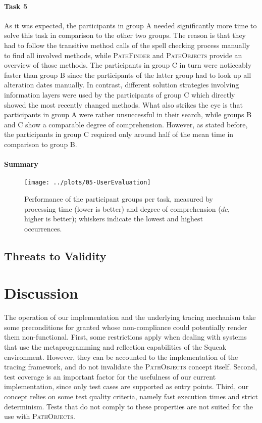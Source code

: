 \paragraph{Task 5} As it was expected, the participants in group A needed significantly more time to solve this task in comparison to the other two groups.
The reason is that they had to follow the transitive method calls of the spell checking process manually to find all involved methods, while \textsc{PathFinder} and \textsc{PathObjects} provide an overview of those methods.
The participants in group C in turn were noticeably faster than group B since the participants of the latter group had to look up all alteration dates manually.
In contrast, different solution strategies involving information layers were used by the participants of group C which directly showed the most recently changed methods.
What also strikes the eye is that participants in group A were rather unsuccessful in their search, while groups B and C show a comparable degree of comprehension.
However, as stated before,  the participants in group C required only around half of the mean time in comparison to group B.

\paragraph{Summary}

\begin{figure}[tb]
	\centering

	\texttt{[image: ../plots/05-UserEvaluation]}
	\caption[Results of the User Study]{Performance of the participant groups per task, measured by processing time (lower is better) and degree of comprehension ($dc$, higher is better); whiskers indicate the lowest and highest occurrences.}
	\label{fig:DiscussionStudyResults}
	
\end{figure}

\subsection{Threats to Validity}

\clearpage
\section{Discussion}
\label{s:DiscussionLimitations}
The operation of our implementation and the underlying tracing mechanism take some preconditions for granted whose non-compliance could potentially render them non-functional.
First, some restrictions apply when dealing with systems that use the metaprogramming and reflection capabilities of the Squeak environment.
However, they can be accounted to the implementation of the tracing framework, and do not invalidate the \textsc{PathObjects} concept itself.
Second, test coverage is an important factor for the usefulness of our current implementation, since only test cases are supported as entry points. 
Third, our concept relies on some test quality criteria, namely fast execution times and strict determinism.
Tests that do not comply to these properties are not suited for the use with \textsc{PathObjects}.

